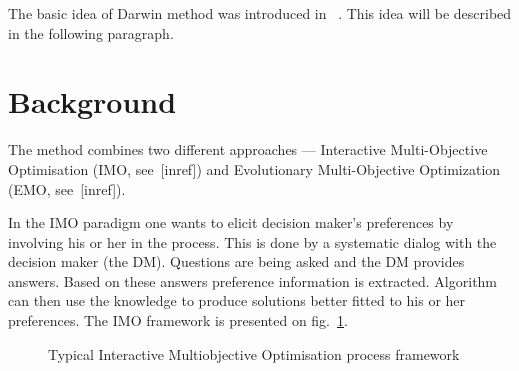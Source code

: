 The basic idea of Darwin method was introduced in~ \cite{GMS09}. This idea will
be described in the following paragraph.

\section{Background}

The method combines two different approaches --- Interactive Multi-Objective
Optimisation (IMO, see~[inref]) and Evolutionary Multi-Objective Optimization
(EMO, see~[inref]).

In the IMO paradigm one wants to elicit decision maker's preferences by
involving his or her in the process. This is done by a systematic dialog with
the decision maker (the DM). Questions are being asked and the DM provides
answers. Based on these answers preference information is extracted. Algorithm
can then use the knowledge to produce solutions better fitted to his or her
preferences. The IMO framework is presented on
fig.~\ref{fig:interactive-process}.

\begin{figure} 
  \begin{center}
    \caption{Typical Interactive Multiobjective
      Optimisation process framework\label{fig:interactive-process}}
  \end{center} 
\end{figure} 


